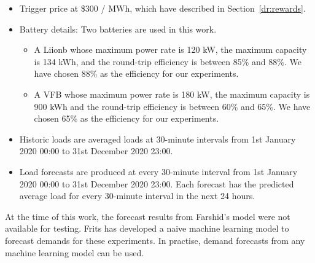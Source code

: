 \begin{itemize}
	\item Trigger price at \$300 / MWh, which have described in Section~\ref{dr:rewards}.
	
	\item Battery details: Two batteries are used in this work.
	\begin{itemize}
		\item  A \gls{Liionb} whose maximum power rate is 120 kW, the maximum capacity is 134 kWh, and the round-trip efficiency is between 85\% and 88\%. We have chosen 88\% as the efficiency for our experiments. 
		
		\item A \gls{VFB} whose maximum power rate is 180 kW, the maximum capacity is 900 kWh and the round-trip efficiency is between 60\% and 65\%. We have chosen 65\% as the efficiency for our experiments. 
	\end{itemize}
	
	\item Historic loads are averaged loads at 30-minute intervals from 1st January 2020 00:00 to 31st December 2020 23:00.
	
	\item Load forecasts are produced at every 30-minute interval from 1st January 2020 00:00 to 31st December 2020 23:00. Each forecast has the predicted average load for every 30-minute interval in the next 24 hours. 
	
\end{itemize}

At the time of this work, the forecast results from Farshid's model were not available for testing. Frits has developed a naive machine learning model to forecast demands for these experiments. 
In practise, demand forecasts from any machine learning model can be used. 


